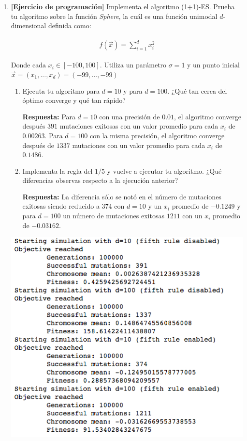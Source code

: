 \documentclass[10pt,letterpaper]{article}
\begin{document}
\begin{enumerate}
    \clearpage
    \item \textbf{[Ejercicio de programación]} Implementa el algoritmo (1+1)-ES. Prueba
          tu algoritmo sobre la función \textit{Sphere}, la cuál es una función unimodal
          $d$-dimensional definida como:

        \begin{equation*} \begin{split} \begin{gathered}
            f(\vec{x}) = \sum_{i=1}^d x_i^2
        \end{gathered} \end{split} \end{equation*}

        Donde cada $x_i \in [-100, 100]$. Utiliza un parámetro $\sigma = 1$ y un punto
        inicial $\vec{x} = (x_1, ..., x_d) = (-99,...,-99)$

        \begin{enumerate}
            \item Ejecuta tu algoritmo para $d=10$ y para $d=100$. ¿Qué tan cerca del óptimo
            converge y qué tan rápido?

            \textbf{Respuesta:} Para $d=10$ con una precisión de $0.01$, el algoritmo converge
            después $391$ mutaciones exitosas con un valor promedio para cada $x_i$ de $0.00263$.
            Para $d=100$ con la misma precisión, el algoritmo converge después de $1337$
            mutaciones con un valor promedio para cada $x_i$ de $0.1486$.

            \item Implementa la regla del $1/5$ y vuelve a ejecutar tu algoritmo. ¿Qué diferencias
            observas respecto a la ejecución anterior?

            \textbf{Respuesta:} La diferencia sólo se notó en el número de mutaciones exitosas
            siendo reducido a $374$ con $d=10$ y un $x_i$ promedio de $-0.1249$ y para $d=100$
            un número de mutaciones exitosas $1211$ con un $x_i$ promedio de $-0.03162$.
        \end{enumerate}

        \begin{center}
            \includegraphics[scale=.6]{./assets/ex-2.png}
        \end{center}
\end{enumerate}
\end{document}
